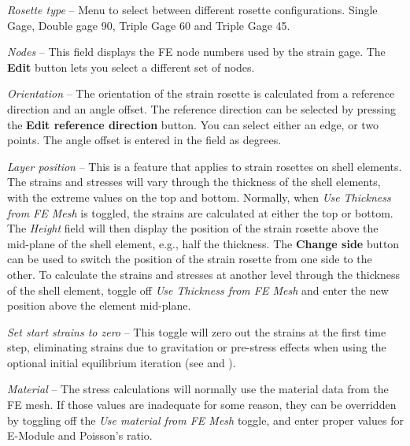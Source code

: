 \begin{bulletlist}
\item{\sl Rosette type} --
  Menu to select between different rosette configurations.
  Single Gage, Double gage 90, Triple Gage 60 and Triple Gage 45.

\item{\sl Nodes} --
  This field displays the FE node numbers used by the strain gage.
  The \textbf{Edit} button lets you select a different set of nodes.

\item{\sl Orientation} --
  The orientation of the strain rosette is calculated from a reference direction
  and an angle offset. The reference direction can be selected by pressing the
  \textbf{Edit reference direction} button. You can select either an edge,
  or two points. The angle offset is entered in the field as degrees.

\item{\sl Layer position} --
  This is a feature that applies to strain rosettes on shell elements.
  The strains and stresses will vary through the thickness of the shell
  elements, with the extreme values on the top and bottom.
  Normally, when {\sl Use Thickness from FE Mesh} is toggled,
  the strains are calculated at either the top or bottom.
  The {\sl Height} field will then display the position of the strain
  rosette above the mid-plane of the shell element, e.g., half the
  thickness. The \textbf{Change side} button can be used to switch the
  position of the strain rosette from one side to the other.
  To calculate the strains and stresses at another level through the
  thickness of the shell element, toggle off {\sl Use Thickness from FE Mesh}
  and enter the new position above the element mid-plane.

\item{\sl Set start strains to zero} --
  This toggle will zero out the strains at the first time step,
  eliminating strains due to gravitation or pre-stress effects when using the
  optional initial equilibrium iteration
  (see  and
  ).

\item{\sl Material} --
  The stress calculations will normally use the material data from the FE mesh.
  If those values are inadequate for some reason, they can be overridden by
  toggling off the {\sl Use material from FE Mesh} toggle,
  and enter proper values for E-Module and Poisson's ratio.
\end{bulletlist}


